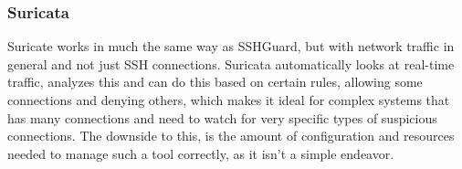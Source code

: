 \subsubsection{Suricata}
Suricate works in much the same way as SSHGuard, but with network traffic in general and not just SSH connections. Suricata automatically looks at real-time traffic, analyzes this and can do this based on certain rules, allowing some connections and denying others, which makes it ideal for complex systems that has many connections and need to watch for very specific types of suspicious connections. The downside to this, is the amount of configuration and resources needed to manage such a tool correctly, as it isn't a simple endeavor.